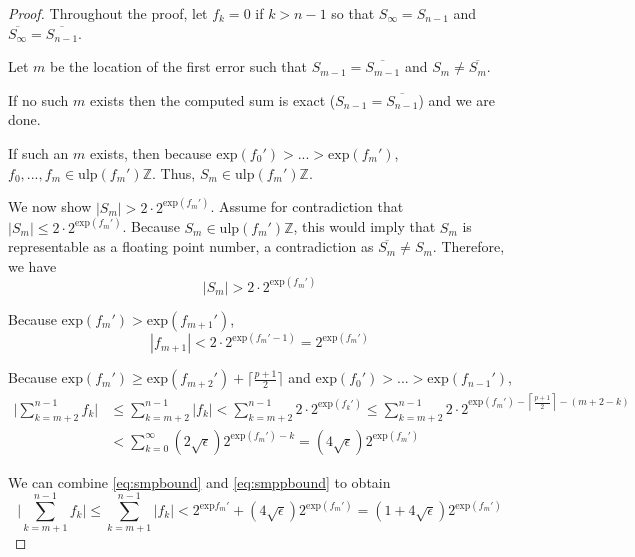 \documentclass[12pt]{article}
\providecommand{\Z}{\ensuremath{\mathbb{Z}}}
\providecommand{\exp}{\ensuremath{\text{exp}}}
\providecommand{\ulp}{\ensuremath{\text{ulp}}}
\theoremstyle{definition}
\numberwithin{equation}{section}
\numberwithin{figure}{section}
\begin{document}
    \begin{proof}

      Throughout the proof, let $f_k = 0$ if $k > n - 1$ so that $S_{\infty} = S_{n - 1}$ and $\overline{S_{\infty}} = \overline{S_{n - 1}}$.

      Let $m$ be the location of the first error such that $S_{m - 1} = \overline{S_{m - 1}}$ and $S_{m} \neq \overline{S_{m}}$.

      If no such $m$ exists then the computed sum is exact ($S_{n - 1} = \overline{S_{n - 1}}$) and we are done.

      If such an $m$ exists, then because $\exp(f_0') > ... > \exp(f_m')$, $f_0, ..., f_m \in \ulp(f_m')\Z$. Thus, $S_m \in \ulp(f_m')\Z$.

      We now show $|S_m| > 2 \cdot 2^{\exp(f_m')}$. Assume for contradiction that $|S_m| \leq 2 \cdot 2^{\exp(f_m')}$. Because $S_m \in \ulp(f_m')\Z$, this would imply that $S_m$ is representable as a floating point number, a contradiction as $\overline{S_m} \neq S_m$. Therefore, we have
      \begin{equation}
        |S_m| > 2 \cdot 2^{\exp(f_m')}
        \label{eq:smbound}
      \end{equation}

      Because $\exp(f_m') > \exp(f_{m + 1}')$,
      \begin{equation}
        |f_{m + 1}| < 2\cdot2^{\exp(f_m' - 1)} = 2^{\exp(f_m')}
        \label{eq:smpbound}
      \end{equation}

      Because $\exp(f_m') \geq \exp(f_{m + 2}') + \lceil\frac{p + 1}{2}\rceil$ and $\exp(f_0') > ... > \exp(f_{n - 1}')$,
      \begin{align}
        \bigl|\sum \limits_{k = m + 2}^{n - 1} f_k\bigr| &\leq \sum \limits_{k = m + 2}^{n - 1} |f_k| < \sum \limits_{k = m + 2}^{n - 1} 2 \cdot 2^{\exp(f_k')} \leq \sum \limits_{k = m + 2}^{n - 1} 2 \cdot 2^{\exp(f_m') - \left\lceil\frac{p + 1}{2}\right\rceil - (m + 2 - k)} \nonumber \\
        &< \sum \limits_{k = 0}^{\infty} \left(2 \sqrt{\epsilon}\right)2^{\exp(f_m') - k} = \left(4\sqrt\epsilon\right)2^{\exp(f_m')}
        \label{eq:smppbound}
      \end{align}

      We can combine  \eqref{eq:smpbound} and \eqref{eq:smppbound} to obtain
      \begin{equation}
        \bigl|\sum\limits_{k = m + 1}^{n - 1} f_k\bigr| \leq \sum\limits_{k = m + 1}^{n - 1} |f_k| < 2^{\exp{f_m'}} + \left(4 \sqrt{\epsilon}\right) 2^{\exp(f_m')} = \left(1 + 4 \sqrt\epsilon \right)2^{\exp(f_m')}
        \label{eq:smsbound}
      \end{equation}


\end{proof}
\end{document}
